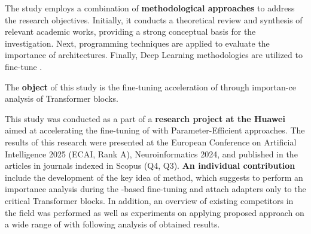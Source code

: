     The study employs a combination of \textbf{methodological approaches} to address the research objectives. Initially, it conducts a theoretical review and synthesis of relevant academic works, providing a strong conceptual basis for the investigation. Next, programming techniques are applied to evaluate the importance of \llms{} architectures. Finally, Deep Learning methodologies are utilized to fine-tune \llms{}.

    The \textbf{object} of this study is the fine-tuning acceleration of \llms{} through importan-ce analysis of Transformer blocks.
    
    This study was conducted as a part of a \textbf{research project at the Huawei} aimed at accelerating the fine-tuning of \llms{} with Parameter-Efficient approaches. The results of this research were presented at the European Conference on Artificial Intelligence 2025 (ECAI, Rank A), Neuroinformatics 2024, and published in the articles in journals indexed in Scopus (Q4, Q3). \textbf{An individual contribution} include the development of the key idea of method, which suggests to perform an importance analysis during the \lora{}-based fine-tuning and attach \lora{} adapters only to the critical Transformer blocks. In addition, an overview of existing competitors in the field was performed as well as experiments on applying proposed approach on a wide range of \llms{} with following analysis of obtained results. 
